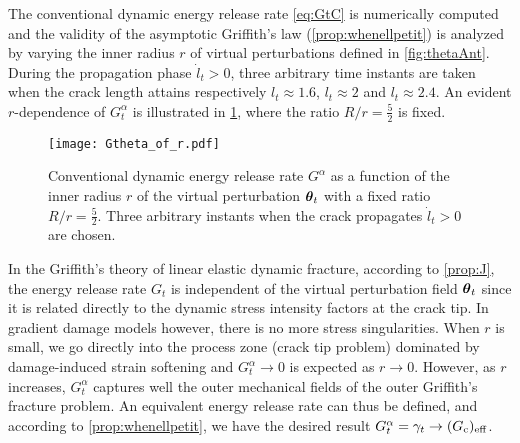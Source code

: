 The conventional dynamic energy release rate \eqref{eq:GtC} is numerically computed and the validity of the asymptotic Griffith's law (\cref{prop:whenellpetit}) is analyzed by varying the inner radius $r$ of virtual perturbations defined in \cref{fig:thetaAnt}. During the propagation phase $\dot{l}_t>0$, three arbitrary time instants are taken when the crack length attains respectively $l_t\approx 1.6$, $l_t\approx 2$ and $l_t\approx 2.4$. An evident $r$-dependence of $G^\alpha_t$ is illustrated in \cref{fig:indvelocity}, where the ratio $R/r=\frac{5}{2}$ is fixed.
\begin{figure}[htbp]
\centering
\texttt{[image: Gtheta\_of\_r.pdf]}
\caption{Conventional dynamic energy release rate $G^\alpha$ as a function of the inner radius $r$ of the virtual perturbation $\vtheta_t$ with a fixed ratio $R/r=\frac{5}{2}$. Three arbitrary instants when the crack propagates $\dot{l}_t>0$ are chosen.} \label{fig:indvelocity}
\end{figure}
In the Griffith's theory of linear elastic dynamic fracture, according to \cref{prop:J}, the energy release rate $G_t$ is independent of the virtual perturbation field $\vtheta_t$ since it is related directly to the dynamic stress intensity factors at the crack tip. In gradient damage models however, there is no more stress singularities. When $r$ is small, we go directly into the process zone (crack tip problem) dominated by damage-induced strain softening and $G^\alpha_t\to 0$ is expected as $r\to 0$. However, as $r$ increases, $G^\alpha_t$ captures well the outer mechanical fields of the outer Griffith's fracture problem. An equivalent energy release rate can thus be defined, and according to \cref{prop:whenellpetit}, we have the desired result $G^\alpha_t=\gamma_t\to (G_\mathrm{c})_\mathrm{eff}$.

